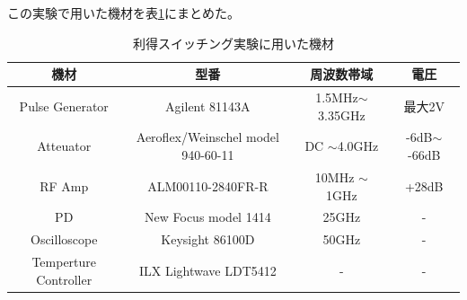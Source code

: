 この実験で用いた機材を表\ref{table:table_2_2_GS_setup}にまとめた。
\begin{table}[h]
  \caption{利得スイッチング実験に用いた機材}
  \label{table:table_2_2_GS_setup}
  \centering
  \begin{tabular}{cccc}
    \hline
    機材  & 型番   & 周波数帯域 &電圧 \\
    \hline \hline
    Pulse Generator  & Agilent 81143A & 1.5MHz$\sim$ 3.35GHz  &最大2V \\
    Atteuator  &  Aeroflex/Weinschel model 940-60-11    & DC $\sim$4.0GHz& -6dB$\sim$ -66dB\\
    RF Amp & ALM00110-2840FR-R & 10MHz $\sim$ 1GHz & +28dB\\
    PD & New Focus model 1414 & 25GHz &-\\
    Oscilloscope  &  Keysight 86100D & 50GHz  &-\\
     Temperture Controller & ILX Lightwave  LDT5412&-&-\\
       \hline
  \end{tabular}
\end{table}
